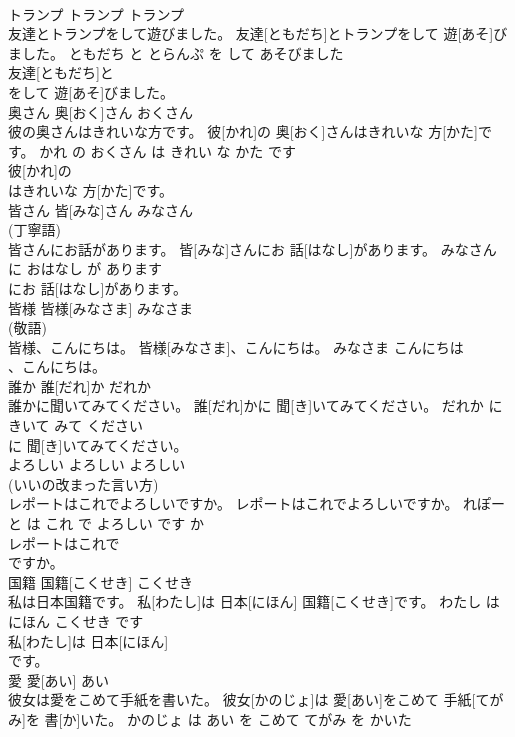 \documentclass[8pt]{extreport}
\begin{document}
\begin{CJK}{UTF8}{min}
\\	トランプ	トランプ	トランプ	
\\	友達とトランプをして遊びました。	友達[ともだち]とトランプをして 遊[あそ]びました。	ともだち と とらんぷ を して あそびました	
\\	友達[ともだち]と
\\	をして 遊[あそ]びました。		
\\	奥さん	奥[おく]さん	おくさん	
\\	彼の奥さんはきれいな方です。	彼[かれ]の 奥[おく]さんはきれいな 方[かた]です。	かれ の おくさん は きれい な かた です	
\\	彼[かれ]の
\\	はきれいな 方[かた]です。		
\\	皆さん	皆[みな]さん	みなさん	
\\	(丁寧語)		
\\	皆さんにお話があります。	皆[みな]さんにお 話[はなし]があります。	みなさん に おはなし が あります	
\\	にお 話[はなし]があります。		
\\	皆様	皆様[みなさま]	みなさま	
\\	(敬語)		
\\	皆様、こんにちは。	皆様[みなさま]、こんにちは。	みなさま こんにちは	
\\	、こんにちは。		
\\	誰か	誰[だれ]か	だれか	
\\	誰かに聞いてみてください。	誰[だれ]かに 聞[き]いてみてください。	だれか に きいて みて ください	
\\	に 聞[き]いてみてください。		
\\	よろしい	よろしい	よろしい	
\\	(いいの改まった言い方)		
\\	レポートはこれでよろしいですか。	レポートはこれでよろしいですか。	れぽーと は これ で よろしい です か	
\\	レポートはこれで
\\	ですか。		
\\	国籍	国籍[こくせき]	こくせき	
\\	私は日本国籍です。	私[わたし]は 日本[にほん] 国籍[こくせき]です。	わたし は にほん こくせき です	
\\	私[わたし]は 日本[にほん]
\\	です。		
\\	愛	愛[あい]	あい	
\\	彼女は愛をこめて手紙を書いた。	彼女[かのじょ]は 愛[あい]をこめて 手紙[てがみ]を 書[か]いた。	かのじょ は あい を こめて てがみ を かいた	

\end{CJK}
\end{document}

